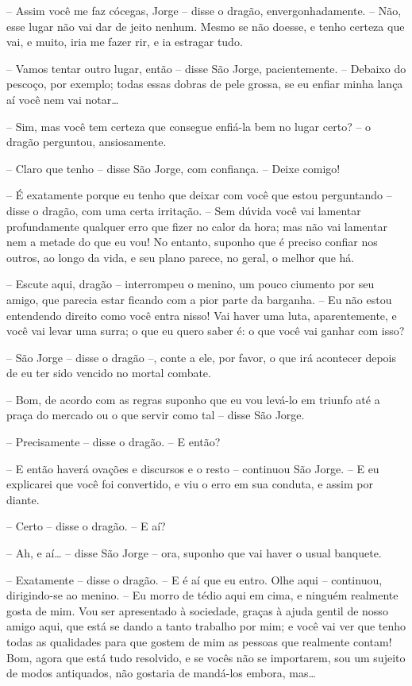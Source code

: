 -- Assim você me faz cócegas, Jorge -- disse o dragão,
envergonhadamente. -- Não, esse lugar não vai dar de jeito nenhum.
Mesmo se não doesse, e tenho certeza que vai, e muito, iria me fazer
rir, e ia estragar tudo.

-- Vamos tentar outro lugar, então -- disse São Jorge, pacientemente. --
Debaixo do pescoço, por exemplo; todas essas dobras de pele grossa,
se eu enfiar minha lança aí você nem vai notar…

-- Sim, mas você tem certeza que consegue enfiá-la bem no lugar certo?
-- o dragão perguntou, ansiosamente.

-- Claro que tenho -- disse São Jorge, com confiança. -- Deixe comigo! 

-- É exatamente porque eu tenho que deixar com você que estou
perguntando -- disse o dragão, com uma certa irritação. -- Sem dúvida
você vai lamentar profundamente qualquer erro que fizer no calor da
hora; mas não vai lamentar nem a metade do que eu vou! No entanto,
suponho que é preciso confiar nos outros, ao longo da vida, e seu
plano parece, no geral, o melhor que há.

-- Escute aqui, dragão -- interrompeu o menino, um pouco ciumento por
seu amigo, que parecia estar ficando com a pior parte da barganha. --
Eu não estou entendendo direito como você entra nisso! Vai haver uma
luta, aparentemente, e você vai levar uma surra; o que eu quero saber
é: o que você vai ganhar com isso?

-- São Jorge -- disse o dragão --, conte a ele, por favor, o que irá
acontecer depois de eu ter sido vencido no mortal combate.

-- Bom, de acordo com as regras suponho que eu vou levá-lo em triunfo
até a praça do mercado ou o que servir como tal -- disse São Jorge.

-- Precisamente -- disse o dragão. -- E então?

-- E então haverá ovações e discursos e o resto -- continuou São Jorge.
-- E eu explicarei que você foi convertido, e viu o erro em sua
conduta, e assim por diante.

-- Certo -- disse o dragão. -- E aí?

-- Ah, e aí… -- disse São Jorge -- ora, suponho que vai haver o usual
banquete.

-- Exatamente -- disse o dragão. -- E é aí que eu entro. Olhe aqui --
continuou, dirigindo-se ao menino. -- Eu morro de tédio aqui em cima,
e ninguém realmente gosta de mim. Vou ser apresentado à sociedade,
graças à ajuda gentil de nosso amigo aqui, que está se dando a tanto
trabalho por mim; e você vai ver que tenho todas as qualidades para
que gostem de mim as pessoas que realmente contam! Bom, agora que
está tudo resolvido, e se vocês não se importarem, sou um sujeito de
modos antiquados, não gostaria de mandá-los embora, mas…

